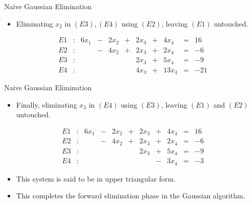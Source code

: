 \documentclass{beamer}
\begin{document}
\begin{frame}{Naive Gaussian Elimination}
\begin{itemize}
\item Eliminating $x_2$ in $(E3),(E4)$ using $(E2)$, leaving $(E1)$ untouched.
\end{itemize}
\begin{block}{}
\begin{align*}
E1&:&6x_1&-&2x_2&+&2 x_3 &+&4 x_4 &=&16\\
E2&:&&-&4x_2&+&2x_3&+&2x_4 &=&-6\\
E3&:&&&&&2x_3&+&5x_4 &=&-9\\
E4&:&&&&&4x_3&+&13x_4 &=&-21 
\end{align*}
\end{block}

\end{frame}
\begin{frame}{Naive Gaussian Elimination}
\begin{itemize}
\item Finally, eliminating $x_3$ in $(E4)$ using $(E3)$, leaving $(E1)$ and $(E2)$ untouched.
\end{itemize}
\begin{block}{}

\begin{align*}
E1&:&6x_1&-&2x_2&+&2 x_3 &+&4 x_4 &=&16\\
E2&:&&-&4x_2&+&2x_3&+&2x_4 &=&-6\\
E3&:&&&&&2x_3&+&5x_4 &=&-9\\
E4&:&&&&&&-&3x_4 &=&-3 
\end{align*}
\end{block}
\begin{itemize}
\item This system is said to be in \alert{upper triangular form}. 
\item This completes the \alert{forward elimination} phase in the Gaussian algorithm.
\end{itemize}


\end{frame}
\end{document}
